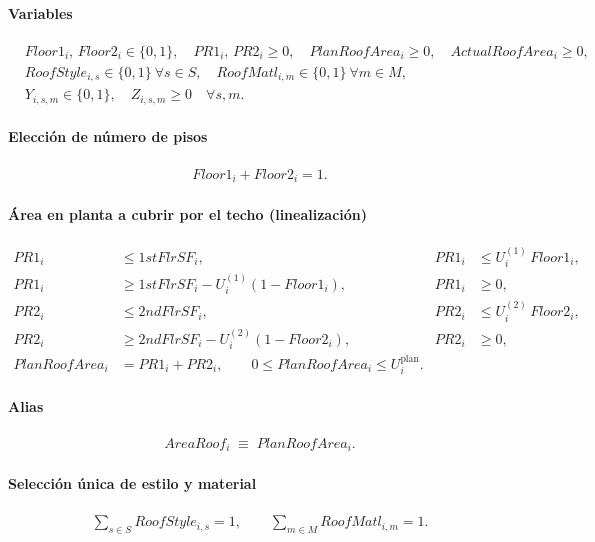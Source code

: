 \paragraph{Variables}
\begin{align*}
&Floor1_i,\, Floor2_i \in \{0,1\},\quad
PR1_i,\, PR2_i \ge 0,\quad
PlanRoofArea_i \ge 0,\quad
ActualRoofArea_i \ge 0,\\
&RoofStyle_{i,s}\in\{0,1\}\ \forall s\in S,\quad
RoofMatl_{i,m}\in\{0,1\}\ \forall m\in M,\\
&Y_{i,s,m}\in\{0,1\},\quad Z_{i,s,m}\ge 0\quad \forall s,m.
\end{align*}

\paragraph{Elección de número de pisos}
\begin{align}
Floor1_i + Floor2_i = 1.
\end{align}

\paragraph{Área en planta a cubrir por el techo (linealización)}
\begin{align}
PR1_i &\le 1stFlrSF_i, &
PR1_i &\le U^{(1)}_i\, Floor1_i,\\
PR1_i &\ge 1stFlrSF_i - U^{(1)}_i(1-Floor1_i), &
PR1_i &\ge 0, \\[6pt]
PR2_i &\le 2ndFlrSF_i, &
PR2_i &\le U^{(2)}_i\, Floor2_i,\\
PR2_i &\ge 2ndFlrSF_i - U^{(2)}_i(1-Floor2_i), &
PR2_i &\ge 0, \\[6pt]
PlanRoofArea_i &= PR1_i + PR2_i, \qquad 0 \le PlanRoofArea_i \le U^{\text{plan}}_i.
\end{align}

\paragraph{Alias}
\begin{align}
AreaRoof_i \;\equiv\; PlanRoofArea_i.
\end{align}

\paragraph{Selección única de estilo y material}
\begin{align}
\sum_{s\in S} RoofStyle_{i,s} = 1, \qquad 
\sum_{m\in M} RoofMatl_{i,m} = 1.
\end{align}

